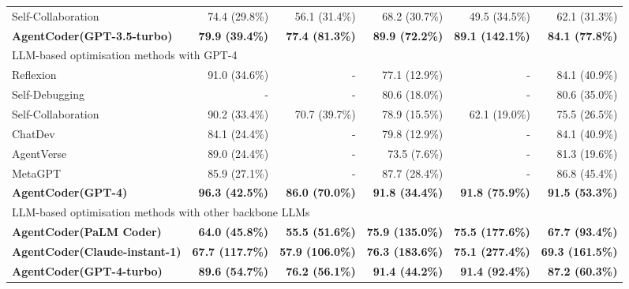 \documentclass{article}
\newcommand{\xxx}{AgentCoder\xspace}
\begin{document}
\begin{table}
\begin{tabular}{lrrrrr}
Self-Collaboration& 74.4 (29.8\%)&56.1 (31.4\%)&68.2 (30.7\%)&49.5 (34.5\%)&62.1 (31.3\%)\\
\textbf{\xxx (GPT-3.5-turbo)}&\cellcolor[rgb]{0.9,0.9,0.9}\textbf{ 79.9 (39.4\%)}&\cellcolor[rgb]{0.9,0.9,0.9}\textbf{77.4 (81.3\%)}&\cellcolor[rgb]{0.9,0.9,0.9}\textbf{89.9 (72.2\%)}&\cellcolor[rgb]{0.9,0.9,0.9}\textbf{89.1 (142.1\%)}&\cellcolor[rgb]{0.9,0.9,0.9}\textbf{84.1 (77.8\%)}\\
\midrule
\multicolumn{6}{l}{LLM-based optimisation methods with GPT-4}\\
\midrule
Reflexion& 91.0 (34.6\%)&-&77.1 (12.9\%)&-&84.1 (40.9\%)\\
Self-Debugging& -&-&80.6 (18.0\%)&-&80.6 (35.0\%)\\
Self-Collaboration& 90.2 (33.4\%)&70.7 (39.7\%)&78.9 (15.5\%)&62.1 (19.0\%)&75.5 (26.5\%)\\
ChatDev&84.1 (24.4\%)&-&79.8 (12.9\%)&-&84.1 (40.9\%) \\
AgentVerse& 89.0 (24.4\%)&-&73.5 (7.6\%)&-&81.3 (19.6\%)\\
MetaGPT& 85.9 (27.1\%)&-&87.7 (28.4\%)&-&86.8 (45.4\%)\\
\textbf{\xxx (GPT-4)}&\cellcolor[rgb]{0.9,0.9,0.9} \textbf{96.3 (42.5\%)}&\cellcolor[rgb]{0.9,0.9,0.9}\textbf{86.0 (70.0\%)}&\cellcolor[rgb]{0.9,0.9,0.9}\textbf{91.8 (34.4\%)}&\cellcolor[rgb]{0.9,0.9,0.9}\textbf{91.8 (75.9\%)}&\cellcolor[rgb]{0.9,0.9,0.9}\textbf{91.5 (53.3\%)}\\
\midrule
\multicolumn{6}{l}{LLM-based optimisation methods with other backbone LLMs}\\
\midrule
\textbf{\xxx (PaLM Coder)}&\cellcolor[rgb]{0.9,0.9,0.9} \textbf{64.0 (45.8\%)}&\cellcolor[rgb]{0.9,0.9,0.9}\textbf{55.5 (51.6\%)}&\cellcolor[rgb]{0.9,0.9,0.9}\textbf{75.9 (135.0\%)}&\cellcolor[rgb]{0.9,0.9,0.9}\textbf{75.5 (177.6\%)}&\cellcolor[rgb]{0.9,0.9,0.9}\textbf{67.7 (93.4\%)}\\
\textbf{\xxx (Claude-instant-1)}&\cellcolor[rgb]{0.9,0.9,0.9}\textbf{67.7 (117.7\%)}&\cellcolor[rgb]{0.9,0.9,0.9}\textbf{57.9 (106.0\%)}&\cellcolor[rgb]{0.9,0.9,0.9}\textbf{76.3 (183.6\%)}&\cellcolor[rgb]{0.9,0.9,0.9}\textbf{75.1 (277.4\%)}&\cellcolor[rgb]{0.9,0.9,0.9}\textbf{69.3 (161.5\%)}\\
\textbf{\xxx (GPT-4-turbo)}& \cellcolor[rgb]{0.9,0.9,0.9}\textbf{89.6 (54.7\%)}&\cellcolor[rgb]{0.9,0.9,0.9}\textbf{76.2 (56.1\%)}&\cellcolor[rgb]{0.9,0.9,0.9}\textbf{91.4 (44.2\%)}&\cellcolor[rgb]{0.9,0.9,0.9}\textbf{91.4 (92.4\%)}&\cellcolor[rgb]{0.9,0.9,0.9}\textbf{87.2 (60.3\%)}\\
     \bottomrule
    \end{tabular}
    \vspace{-0.3cm}
    \label{tab:end2end}
\end{table}
\end{document}
